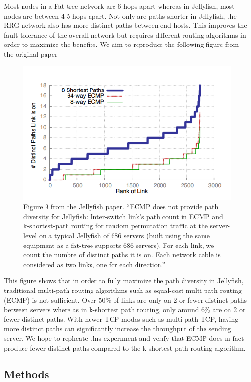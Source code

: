 \documentclass[letter paper, 11pt]{article}
\begin{document}
Most nodes in a Fat-tree network are 6 hops apart whereas in Jellyfish, most nodes are between 4-5 hops apart. Not only are paths shorter in Jellyfish, the RRG network also has more distinct paths between end hosts. This improves the fault tolerance of the overall network but requires different routing algorithms in order to maximize the benefits. We aim to reproduce the following figure from the original paper

\begin{figure}
\centering
\includegraphics[scale=0.5]{9}
\caption{Figure 9 from the Jellyfish paper. ``ECMP does not provide path diversity for Jellyfish: Inter-switch link's path count in ECMP and k-shortest-path routing for random permutation traffic at the server-level on a typical Jellyfish of 686 servers (built using the same equipment as a fat-tree supports 686 servers). For each link, we count the numbre of distinct paths it is on. Each network cable is considered as two links, one for each direction.''}
\end{figure}

This figure shows that in order to fully maximize the path diversity in Jellyfish, traditional multi-path routing algorithms such as equal-cost multi path routing (ECMP) is not sufficient. Over 50\% of links are only on 2 or fewer distinct paths between servers where as in k-shortest path routing, only around 6\% are on 2 or fewer distinct paths. With newer TCP modes such as multi-path TCP, having more distinct paths can significantly increase the throughput of the sending server. We hope to replicate this experiment and verify that ECMP does in fact produce fewer distinct paths compared to the k-shortest path routing algorithm.

\subsection*{Methods}
\end{document}
